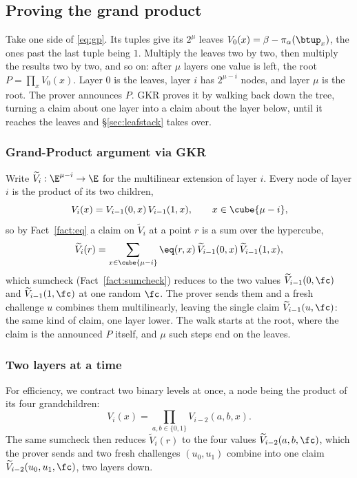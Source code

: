 \subsection{Proving the grand product}\label{sec:gkr}

Take one side of \eqref{eq:gp}. Its tuples give its $2^{\mu}$ leaves $V_0(x)=\beta-\pi_\alpha(\btup_x)$, the ones past the last tuple being $1$. Multiply the leaves two by two, then multiply the results two by two, and so on: after $\mu$ layers one value is left, the root $P=\prod_xV_0(x)$. Layer $0$ is the leaves, layer $i$ has $2^{\mu-i}$ nodes, and layer $\mu$ is the root. The prover announces $P$. GKR proves it by walking back down the tree, turning a claim about one layer into a claim about the layer below, until it reaches the leaves and \S\ref{sec:leafstack} takes over.

\subsubsection{Grand-Product argument via GKR}

Write $\widetilde V_i:\E^{\mu-i}\to\E$ for the multilinear extension of layer $i$. Every node of layer $i$ is the product of its two children,
\[
V_i(x)=V_{i-1}(0,x)\,V_{i-1}(1,x),\qquad x\in\cube{\mu-i},
\]
so by Fact~\ref{fact:eq} a claim on $\widetilde V_i$ at a point $r$ is a sum over the hypercube,
\[
\widetilde V_i(r)=\sum_{x\in\cube{\mu-i}}\eq(r,x)\,\widetilde V_{i-1}(0,x)\,\widetilde V_{i-1}(1,x),
\]
which sumcheck (Fact~\ref{fact:sumcheck}) reduces to the two values $\widetilde V_{i-1}(0,\fc)$ and $\widetilde V_{i-1}(1,\fc)$ at one random $\fc$. The prover sends them and a fresh challenge $u$ combines them multilinearly, leaving the single claim $\widetilde V_{i-1}(u,\fc)$: the same kind of claim, one layer lower. The walk starts at the root, where the claim is the announced $P$ itself, and $\mu$ such steps end on the leaves.

\subsubsection{Two layers at a time}

For efficiency, we contract two binary levels at once, a node being the product of its four grandchildren:
\[
V_i(x)=\prod_{a,b\in\{0,1\}}V_{i-2}(a,b,x).
\]
The same sumcheck then reduces $\widetilde V_i(r)$ to the four values $\widetilde V_{i-2}(a,b,\fc)$, which the prover sends and two fresh challenges $(u_0,u_1)$ combine into one claim $\widetilde V_{i-2}(u_0,u_1,\fc)$, two layers down.

